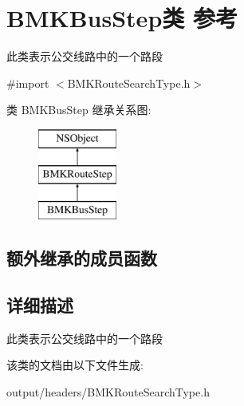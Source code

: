 \hypertarget{interface_b_m_k_bus_step}{}\section{B\+M\+K\+Bus\+Step类 参考}
\label{interface_b_m_k_bus_step}


此类表示公交线路中的一个路段  




{\ttfamily \#import $<$B\+M\+K\+Route\+Search\+Type.\+h$>$}

类 B\+M\+K\+Bus\+Step 继承关系图\+:\begin{figure}[H]
\begin{center}
\leavevmode
\includegraphics[height=3.000000cm]{interface_b_m_k_bus_step}
\end{center}
\end{figure}
\subsection*{额外继承的成员函数}


\subsection{详细描述}
此类表示公交线路中的一个路段 

该类的文档由以下文件生成\+:\begin{DoxyCompactItemize}
\item 
output/headers/B\+M\+K\+Route\+Search\+Type.\+h\end{DoxyCompactItemize}
